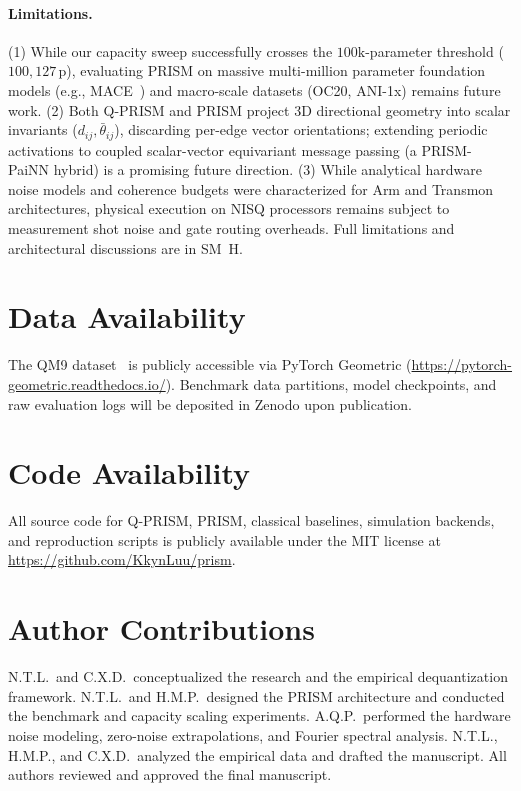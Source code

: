 \documentclass[10pt,twocolumn,letterpaper]{article}
\begin{document}
\paragraph{Limitations.}
(1) While our capacity sweep successfully crosses the $100\mathrm{k}$-parameter threshold ($100{,}127$\,p), evaluating PRISM on massive multi-million parameter foundation models (e.g., MACE~\cite{batatiaMACEHigherOrder2022}) and macro-scale datasets (OC20, ANI-1x) remains future work. (2) Both Q-PRISM and PRISM project 3D directional geometry into scalar invariants ($d_{ij}, \bar{\theta}_{ij}$), discarding per-edge vector orientations; extending periodic activations to coupled scalar-vector equivariant message passing (a PRISM-PaiNN hybrid) is a promising future direction. (3) While analytical hardware noise models and coherence budgets were characterized for Arm and Transmon architectures, physical execution on NISQ processors remains subject to measurement shot noise and gate routing overheads. Full limitations and architectural discussions are in SM~H.

\section*{Data Availability}
The QM9 dataset~\cite{ramakrishnan2014quantum} is publicly accessible via PyTorch Geometric (\url{https://pytorch-geometric.readthedocs.io/}). Benchmark data partitions, model checkpoints, and raw evaluation logs will be deposited in Zenodo upon publication.

\section*{Code Availability}
All source code for Q-PRISM, PRISM, classical baselines, simulation backends, and reproduction scripts is publicly available under the MIT license at \url{https://github.com/KkynLuu/prism}.

\section*{Author Contributions}
N.T.L.\ and C.X.D.\ conceptualized the research and the empirical dequantization framework. N.T.L.\ and H.M.P.\ designed the PRISM architecture and conducted the benchmark and capacity scaling experiments. A.Q.P.\ performed the hardware noise modeling, zero-noise extrapolations, and Fourier spectral analysis. N.T.L., H.M.P., and C.X.D.\ analyzed the empirical data and drafted the manuscript. All authors reviewed and approved the final manuscript.
\end{document}
